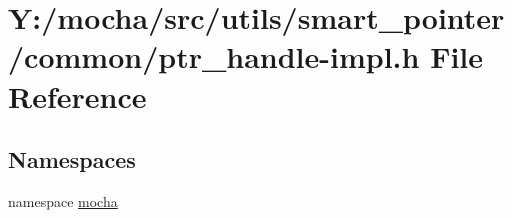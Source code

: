 \hypertarget{ptr__handle-impl_8h}{
\section{Y:/mocha/src/utils/smart\_\-pointer/common/ptr\_\-handle-\/impl.h File Reference}
\label{ptr__handle-impl_8h}
}
\subsection*{Namespaces}
\begin{DoxyCompactItemize}
\item 
namespace \hyperlink{namespacemocha}{mocha}
\end{DoxyCompactItemize}
